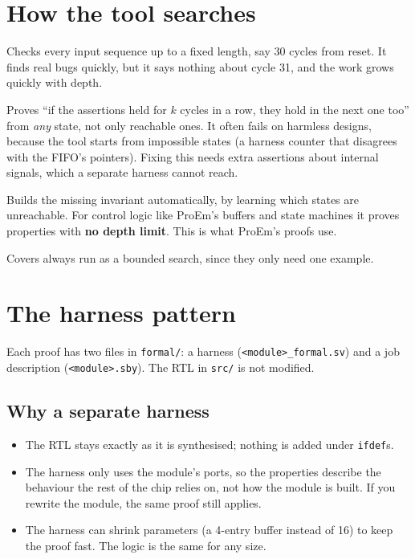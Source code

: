 \documentclass[11pt,a4paper]{article}
\newcommand{\file}[1]{\texttt{#1}}
\begin{document}
\section{How the tool searches}\label{sec:modes}

\begin{description}[style=nextline,leftmargin=1.5em]
\item[Bounded model checking (\texttt{mode bmc})]
Checks every input sequence up to a fixed length, say 30 cycles from reset. It finds real bugs quickly, but it says nothing about cycle 31, and the work grows quickly with depth.

\item[k-induction (\texttt{mode prove} with \texttt{smtbmc})]
Proves ``if the assertions held for $k$ cycles in a row, they hold in the next one too'' from \emph{any} state, not only reachable ones. It often fails on harmless designs, because the tool starts from impossible states (a harness counter that disagrees with the FIFO's pointers). Fixing this needs extra assertions about internal signals, which a separate harness cannot reach.

\item[PDR, also called IC3 (\texttt{mode prove} with \texttt{abc pdr})]
Builds the missing invariant automatically, by learning which states are unreachable. For control logic like ProEm's buffers and state machines it proves properties with \textbf{no depth limit}. This is what ProEm's proofs use.
\end{description}

Covers always run as a bounded search, since they only need one example.

\section{The harness pattern}

Each proof has two files in \file{formal/}: a harness (\file{\textless module\textgreater\_formal.sv}) and a job description (\file{\textless module\textgreater.sby}). The RTL in \file{src/} is not modified.

\subsection{Why a separate harness}

\begin{itemize}
\item The RTL stays exactly as it is synthesised; nothing is added under \texttt{ifdef}s.
\item The harness only uses the module's ports, so the properties describe the behaviour the rest of the chip relies on, not how the module is built. If you rewrite the module, the same proof still applies.
\item The harness can shrink parameters (a 4-entry buffer instead of 16) to keep the proof fast. The logic is the same for any size.
\end{itemize}
\end{document}
